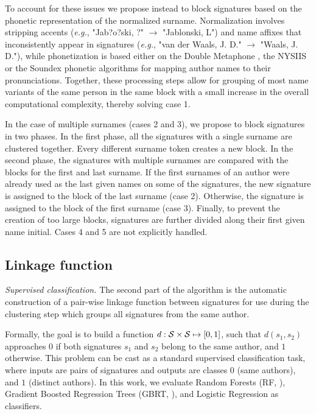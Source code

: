 \documentclass[conference]{IEEEtran}
\newcommand{\eg}{\emph{e.g.}\xspace}
\begin{document}
To account for these issues we propose instead to block signatures based on the
phonetic representation of the normalized surname.
Normalization involves stripping accents (\eg, "Jab?o?ski, ?" $\rightarrow$ "Jablonski, L") and name
affixes that inconsistently appear in signatures (\eg, "van der Waals, J. D."
$\rightarrow$ "Waals, J. D."), while phonetization is based either on the
Double Metaphone \cite{doublemetaphone}, the NYSIIS \cite{nysiis} or the
Soundex \cite{Soundex} phonetic algorithms for mapping author names to their pronunciations.
Together, these processing steps allow for grouping of most name variants of the same
person in the same block with a small increase in the overall computational complexity, thereby solving case 1.

In the case of multiple surnames (cases 2 and 3), we propose to block
signatures in two phases.
In the first phase, all the signatures with a single surname are clustered together.
Every different surname token creates a new block.
In the second phase, the signatures with multiple surnames are compared
with the blocks for the first and last surname.
If the first surnames of an author were already used as the last given names on some of the signatures, the
new signature is assigned to the block of the last surname (case 2).
Otherwise, the signature is assigned to the block of the first surname (case 3).
Finally, to prevent the creation of too large blocks, signatures are further divided
along their first given name initial.
Cases 4 and 5 are not explicitly handled.

\subsection{Linkage function}
\label{methods:linkage}

\textit{Supervised classification.} The second part of the algorithm is the
automatic construction of a pair-wise linkage function between signatures for use
during the clustering step which groups all signatures from the same author.

Formally, the goal is to build a function $d: {\cal S} \times {\cal S} \mapsto
[0, 1]$, such that $d(s_1, s_2)$ approaches $0$ if both signatures $s_1$ and
$s_2$ belong to the same author, and $1$ otherwise.
This problem can be cast as a standard supervised classification task, where inputs
are pairs of signatures and outputs are classes $0$ (same authors), and $1$
(distinct authors). In this work, we evaluate Random Forests (RF, \cite{breiman2001random}),
Gradient Boosted Regression Trees (GBRT, \cite{friedman2001greedy}),
and Logistic Regression \cite{fan2008liblinear} as classifiers.
\end{document}
